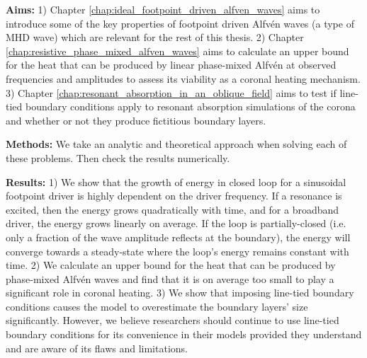 \begin{spacing}{1.1}
\textbf{Aims:}
1) Chapter \ref{chap:ideal_footpoint_driven_alfven_waves} aims to introduce some of the key properties of footpoint driven Alfv\'en waves (a type of MHD wave) which are relevant for the rest of this thesis.
2) Chapter \ref{chap:resistive_phase_mixed_alfven_waves} aims to calculate an upper bound for the heat that can be produced by linear phase-mixed Alfv\'en at observed frequencies and amplitudes to assess its viability as a coronal heating mechanism.
3) Chapter \ref{chap:resonant_absorption_in_an_oblique_field} aims to test if line-tied boundary conditions apply to resonant absorption simulations of the corona and whether or not they produce fictitious boundary layers.

\textbf{Methods:} We take an analytic and theoretical approach when solving each of these problems. Then check the results numerically.

\textbf{Results:} 1) We show that the growth of energy in closed loop for a sinusoidal footpoint driver is highly dependent on the driver frequency. If a resonance is excited, then the energy grows quadratically with time, and for a broadband driver, the energy grows linearly on average. If the loop is partially-closed (i.e. only a fraction of the wave amplitude reflects at the boundary), the energy will converge towards a steady-state where the loop's energy remains constant with time. 
2) We calculate an upper bound for the heat that can be produced by phase-mixed Alfv\'en waves and find that it is on average too small to play a significant role in coronal heating. 
3) We show that imposing line-tied boundary conditions causes the model to overestimate the boundary layers' size significantly. However, we believe researchers should continue to use line-tied boundary conditions for its convenience in their models provided they understand and are aware of its flaws and limitations.

\end{spacing}